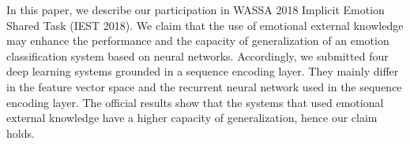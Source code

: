 In this paper, we describe our participation in WASSA 2018 Implicit Emotion Shared Task (IEST 2018). We claim that the use of emotional external knowledge may enhance the performance and the capacity of generalization of an emotion classification system based on neural networks. Accordingly, we submitted four deep learning systems grounded in a sequence encoding layer. They mainly differ in the feature vector space and the recurrent neural network used in the sequence encoding layer. The official results show that the systems that used emotional external knowledge have a higher capacity of generalization, hence our claim holds.

